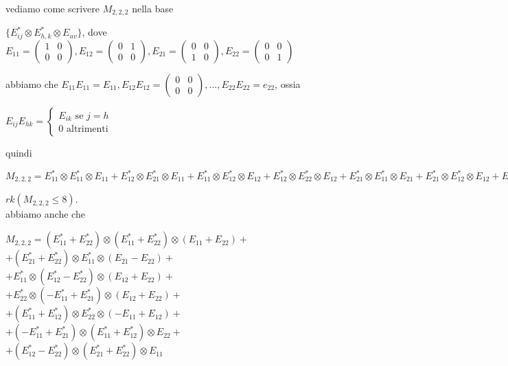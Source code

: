 \documentclass[a4paper,12pt]{article}
\theoremstyle{def}
\theoremstyle{prop}
\theoremstyle{esempio}
\theoremstyle{dimostrazione}
\theoremstyle{teo}
\theoremstyle{osservazione}
\begin{document}
vediamo come scrivere \(M_{2,2,2}\) nella base 
\begin{center}
	\(\{E_{ij}^* \otimes E_{h,k}^* \otimes E_{uv}\}\), dove\\
	\(E_{11} = \begin{pmatrix}
		1 & 0  \\
		0 & 0
	\end{pmatrix}, 
	E_{12} = \begin{pmatrix}
		0 & 1  \\
		0 & 0
	\end{pmatrix},
	E_{21} = \begin{pmatrix}
		0 & 0  \\
		1 & 0
	\end{pmatrix},
	E_{22} = \begin{pmatrix}
		0 & 0  \\
		0 & 1
	\end{pmatrix}\)
\end{center}
abbiamo che \(E_{11}E_{11} = E_{11}, E_{12}E_{12} = \begin{pmatrix}
	0 & 0  \\
	0 & 0
\end{pmatrix}, ..., E_{22}E_{22} = e_{22}\), ossia
\begin{center}
	\(E_{ij} E_{hk} = \begin{cases}
		E_{ik} \text{ se } j = h \\
		0 \text{ altrimenti}
	\end{cases}\)
\end{center}
quindi 
\begin{center}
	\(M_{2,2,2} = E_{11}^* \otimes E_{11}^* \otimes E_{11} + E_{12}^* \otimes E_{21}^* \otimes E_{11} + E_{11}^* \otimes E_{12}^* \otimes E_{12} + E_{12}^* \otimes E_{22}^* \otimes E_{12} + E_{21}^* \otimes E_{11}^* \otimes E_{21} + E_{21}^* \otimes E_{12}^* \otimes E_{12} + E_{22}^* \otimes E_{22}^* \otimes E_{22} + E_{22}^* \otimes E_{21}^* \otimes E_{21}\)\\
\end{center}
\(rk(M_{2,2,2} \leq 8)\).\\
abbiamo anche che
\begin{center}
	\(M_{2,2,2} = (E_{11}^* + E_{22}^*) \otimes (E_{11}^* + E_{22}^*) \otimes (E_{11} + E_{22}) + \)\\
	\(+ (E_{21}^* + E_{22}^*) \otimes E_{11}^* \otimes (E_{21} - E_{22}) + \)\\
	\(+ E_{11}^* \otimes (E_{12}^* - E_{22}^*) \otimes (E_{12} + E_{22}) + \)\\
	\(+ E_{22}^* \otimes (-E_{11}^* + E_{21}^*) \otimes (E_{12} + E_{22}) + \)\\
	\(+ (E_{11}^* + E_{12}^*) \otimes E_{22}^* \otimes (-E_{11} + E_{12}) + \)\\
	\(+ (-E_{11}^* + E_{21}^*) \otimes (E_{11}^* + E_{12}^*) \otimes E_{22} + \)\\
	\(+ (E_{12}^* - E_{22}^*) \otimes (E_{21}^* + E_{22}^*) \otimes E_{11}\)\\
	
\end{center}
\end{document}
